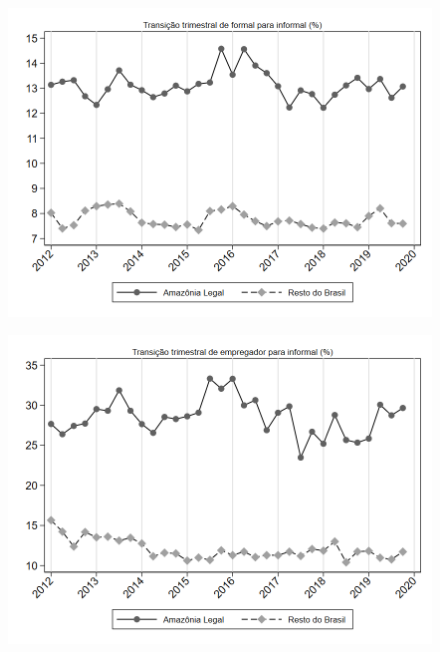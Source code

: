 \documentclass[11pt]{beamer}
\begin{document}
\begin{frame}[label=_transicao_ocupacao_sh_formal_sh_informal]{}
\textit{\hyperlink{_transicao_ocupacao}{}}
\begin{figure}
  \centering
  \includegraphics[width=1.0\linewidth]{../../analysis/output/transicao_ocupacao/_transicao_ocupacao_sh_formal_sh_informal.png}
  \caption{}
  \label{fig:_transicao_ocupacao_sh_formal_sh_informal}
\end{figure}
\end{frame}

\begin{frame}[label=_transicao_ocupacao_sh_empregador_sh_informal]{}
\textit{\hyperlink{_transicao_ocupacao}{}}
\begin{figure}
  \centering
  \includegraphics[width=1\linewidth]{../../analysis/output/transicao_ocupacao/_transicao_ocupacao_sh_empregador_sh_informal.png}
  \caption{}
  \label{fig:_transicao_ocupacao_sh_empregador_sh_informal}
\end{figure}
\end{frame}
\end{document}
